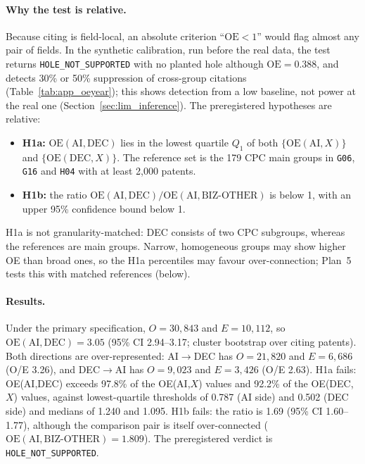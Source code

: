 \paragraph{Why the test is relative.} Because citing is field-local, an absolute criterion ``$\mathrm{OE} < 1$'' would flag almost any pair of fields. In the synthetic calibration, run before the real data, the test returns \texttt{HOLE\_\allowbreak NOT\_\allowbreak SUPPORTED} with no planted hole although $\mathrm{OE} = 0.388$, and detects 30\% or 50\% suppression of cross-group citations (Table~\ref{tab:app_oeyear}); this shows detection from a low baseline, not power at the real one (Section~\ref{sec:lim_inference}). The preregistered hypotheses are relative:
\begin{itemize}
  \item \textbf{H1a:} $\mathrm{OE}(\mathrm{AI},\mathrm{DEC})$ lies in the lowest quartile $Q_1$ of both $\{\mathrm{OE}(\mathrm{AI},X)\}$ and $\{\mathrm{OE}(\mathrm{DEC},X)\}$. The reference set is the 179 CPC main groups in \texttt{G06}, \texttt{G16} and \texttt{H04} with at least 2,000 patents.
  \item \textbf{H1b:} the ratio $\mathrm{OE}(\mathrm{AI},\mathrm{DEC}) / \mathrm{OE}(\mathrm{AI},\mathrm{BIZ\text{-}OTHER})$ is below 1, with an upper 95\% confidence bound below 1.
\end{itemize}
H1a is not granularity-matched: DEC consists of two CPC subgroups, whereas the references are main groups. Narrow, homogeneous groups may show higher OE than broad ones, so the H1a percentiles may favour over-connection; Plan~5 tests this with matched references (below).

\paragraph{Results.} Under the primary specification, $O = 30{,}843$ and $E = 10{,}112$, so $\mathrm{OE}(\mathrm{AI},\mathrm{DEC}) = 3.05$ (95\% CI 2.94--3.17; cluster bootstrap over citing patents). Both directions are over-represented: AI$\rightarrow$DEC has $O = 21{,}820$ and $E = 6{,}686$ (O/E 3.26), and DEC$\rightarrow$AI has $O = 9{,}023$ and $E = 3{,}426$ (O/E 2.63). H1a fails: OE(AI,DEC) exceeds 97.8\% of the OE(AI,$X$) values and 92.2\% of the OE(DEC,$X$) values, against lowest-quartile thresholds of 0.787 (AI side) and 0.502 (DEC side) and medians of 1.240 and 1.095. H1b fails: the ratio is 1.69 (95\% CI 1.60--1.77), although the comparison pair is itself over-connected ($\mathrm{OE}(\mathrm{AI},\mathrm{BIZ\text{-}OTHER}) = 1.809$). The preregistered verdict is \texttt{HOLE\_\allowbreak NOT\_\allowbreak SUPPORTED}.

